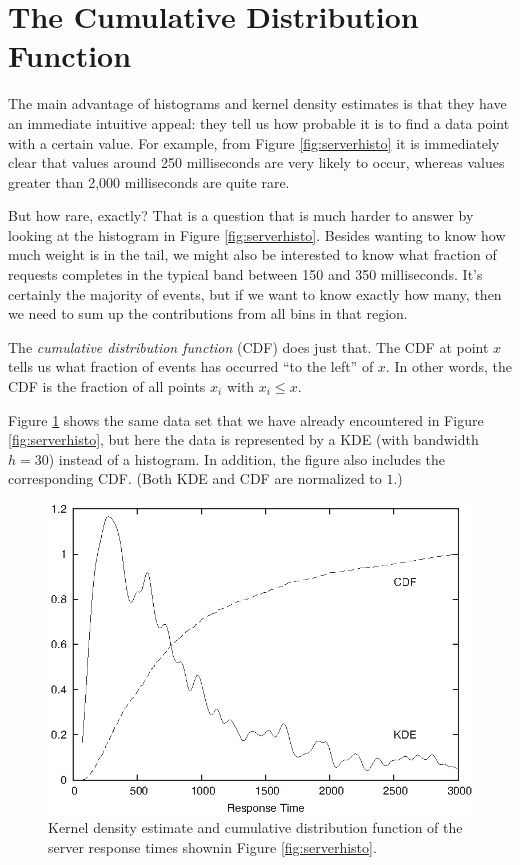 \section{The Cumulative Distribution Function}

  
The main advantage of histograms and kernel density estimates is that
they have an immediate intuitive appeal: they tell us how probable it
is to find a data point with a certain value. For example, from Figure
\ref{fig:serverhisto} it is immediately clear that values around 250
milliseconds are very likely to occur, whereas values greater than
2,000 milliseconds are quite rare.

But how rare, exactly? That is a question that is much harder to
answer by looking at the histogram in Figure \ref{fig:serverhisto}.
Besides wanting to know how much weight is in the tail, we might also
be interested to know what fraction of requests completes in the
typical band between 150 and 350 milliseconds. It's certainly the
majority of events, but if we want to know exactly how many, then we
need to sum up the contributions from all bins in that region.

The \emph{cumulative distribution function} (CDF) does just that. The CDF at
point $x$ tells us what fraction of events has occurred ``to the
left'' of $x$. In other words, the CDF is the fraction of all points
$x_i$ with $x_i \le x$.

Figure \ref{fig:serverkde} shows the same data set that we have
already encountered in Figure \ref{fig:serverhisto}, but here the data
is represented by a KDE (with bandwidth $h=30$) instead of a
histogram. In addition, the figure also includes the corresponding
CDF.  (Both KDE and CDF are normalized to $1$.)

\begin{figure}
  \centerline{\includegraphics{img/server-data-kde}}
  \caption{Kernel density estimate and cumulative distribution
    function of the server response times shown\break in Figure
    \ref{fig:serverhisto}.}\label{fig:serverkde}
\end{figure}

